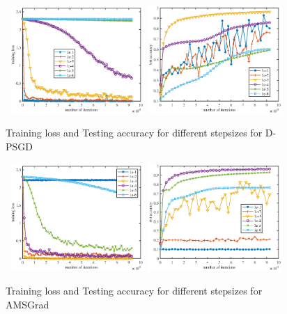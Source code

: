 \documentclass[anon,12pt]{colt2021} %
\begin{document}
\begin{figure}[H]
    \begin{center}
\mbox{
	\includegraphics[width=0.45\textwidth]{figures/sgd_train.eps}
    \includegraphics[width=0.45\textwidth]{figures/sgd_test.eps}
	}
    \end{center}
\caption{Training loss and Testing accuracy for different stepsizes for D-PSGD}
	\label{fig: sgd_curve}
\end{figure}



\begin{figure}[H]
    \begin{center}
\mbox{
	\includegraphics[width=0.45\textwidth]{figures/amsgrad_train.eps}
    \includegraphics[width=0.45\textwidth]{figures/amsgrad_test.eps}
	}
    \end{center}
\caption{Training loss and Testing accuracy for different stepsizes for AMSGrad}
	\label{fig: amsgrad_curve}
\end{figure}
\end{document}
